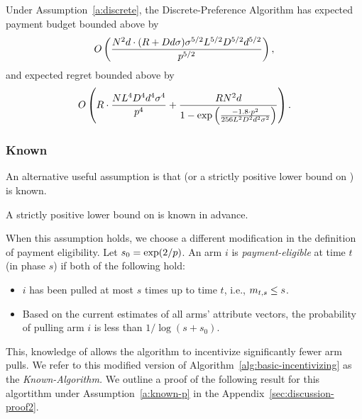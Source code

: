 \begin{theorem}
\label{rst:discrete}
Under Assumption~\ref{a:discrete}, the Discrete-Preference Algorithm has expected payment budget bounded above by 
\begin{align*}
O \left(\frac{N^2 d \cdot (R + D d \sigma)\sigma^{5/2}L^{5/2}D^{5/2}d^{5/2}}{p^{5/2}} \right),
\end{align*}
and expected regret bounded above by 
\begin{align}
O \left(R\cdot \frac{N L^4 D^4 d^4 \sigma^4}{p^4}
  + \frac{R N^2 d}{1 - \exp \left(
    \frac{-1.8 \cdot p^2}{256 L^2 D^2 d^2 \sigma^2}
  \right)} \right).  \nonumber
\end{align}
\end{theorem}



\subsubsection{Known \MinProb}
An alternative useful assumption is that \MinProb (or a strictly positive lower bound on \MinProb) is known.

\begin{assumption}
\label{a:known-p}
A strictly positive lower bound on \MinProb is known in advance.
\end{assumption}

When this assumption holds, we choose a different modification in the definition of payment eligibility.
Let $s_0 = \exp(2/p)$.
An arm $i$ is \emph{payment-eligible} at time $t$ (in phase $s$)
if both of the following hold:
\begin{itemize}
\item $i$ has been pulled at most
$s$ times up to time $t$, i.e., $m_{t,s} \leq s$.
\item Based on the current estimates  of all arms' attribute vectors, the probability of pulling arm $i$ is less than $1/\log(s+s_0)$.
\end{itemize}

This, knowledge of \MinProb allows the algorithm to incentivize significantly fewer arm pulls.
We refer to this modified version of Algorithm~\ref{alg:basic-incentivizing} as the \emph{Known-\MinProb Algorithm.}
We outline a proof of the following result for this algortithm under Assumption~\ref{a:known-p} in the Appendix~\ref{sec:discussion-proof2}.

